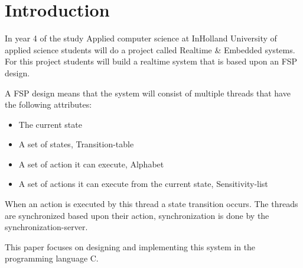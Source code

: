 \hypertarget{introduction}{%
\chapter{Introduction}\label{introduction}}

In year 4 of the study Applied computer science at InHolland University
of applied science students will do a project called Realtime \&
Embedded systems. For this project students will build a realtime system
that is based upon an FSP design.

A FSP design means that the system will consist of multiple threads that
have the following attributes:

\begin{itemize}
\tightlist
\item
  The current state
\item
  A set of states, Transition-table
\item
  A set of action it can execute, Alphabet
\item
  A set of actions it can execute from the current state,
  Sensitivity-list
\end{itemize}

When an action is executed by this thread a state transition occurs. The
threads are synchronized based upon their action, synchronization is
done by the synchronization-server.

This paper focuses on designing and implementing this system in the
programming language C.
